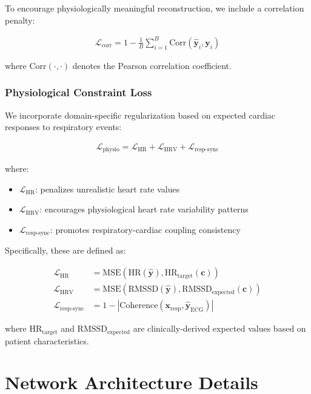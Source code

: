 \documentclass[11pt]{article}
\begin{document}
To encourage physiologically meaningful reconstruction, we include a correlation penalty:

\begin{align}
\mathcal{L}_{\text{corr}} = 1 - \frac{1}{B} \sum_{i=1}^B \text{Corr}(\hat{\mathbf{y}}_i, \mathbf{y}_i)
\end{align}

where $\text{Corr}(\cdot, \cdot)$ denotes the Pearson correlation coefficient.

\subsubsection{Physiological Constraint Loss}

We incorporate domain-specific regularization based on expected cardiac responses to respiratory events:

\begin{align}
\mathcal{L}_{\text{physio}} = \mathcal{L}_{\text{HR}} + \mathcal{L}_{\text{HRV}} + \mathcal{L}_{\text{resp-sync}}
\end{align}

where:
\begin{itemize}
    \item $\mathcal{L}_{\text{HR}}$: penalizes unrealistic heart rate values
    \item $\mathcal{L}_{\text{HRV}}$: encourages physiological heart rate variability patterns
    \item $\mathcal{L}_{\text{resp-sync}}$: promotes respiratory-cardiac coupling consistency
\end{itemize}

Specifically, these are defined as:

\begin{align}
\mathcal{L}_{\text{HR}} &= \text{MSE}(\text{HR}(\hat{\mathbf{y}}), \text{HR}_{\text{target}}(\mathbf{c})) \\
\mathcal{L}_{\text{HRV}} &= \text{MSE}(\text{RMSSD}(\hat{\mathbf{y}}), \text{RMSSD}_{\text{expected}}(\mathbf{c})) \\
\mathcal{L}_{\text{resp-sync}} &= 1 - |\text{Coherence}(\mathbf{x}_{\text{resp}}, \hat{\mathbf{y}}_{\text{ECG}})|
\end{align}

where $\text{HR}_{\text{target}}$ and $\text{RMSSD}_{\text{expected}}$ are clinically-derived expected values based on patient characteristics.

\section{Network Architecture Details}
\end{document}
